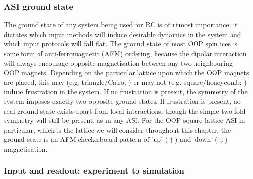 \subsubsection{ASI ground state}
The ground state of any system being used for RC is of utmost importance; it dictates which input methods will induce desirable dynamics in the system and which input protocols will fall flat.
The ground state of most OOP spin ices is some form of anti-ferromagnetic (AFM) ordering, because the dipolar interaction will always encourage opposite magnetisation between any two neighbouring OOP magnets.
Depending on the particular lattice upon which the OOP magnets are placed, this may (e.g. triangle/Cairo; ) or may not (e.g. square/honeycomb; ) induce frustration in the system.
If no frustration is present, the symmetry of the system imposes exactly two opposite ground states.
If frustration is present, no real ground state exists apart from local interactions, though the simple two-fold symmetry will still be present, as in any ASI.
For the OOP square-lattice ASI in particular, which is the lattice we will consider throughout this chapter, the ground state is an AFM checkerboard pattern of `up' ($\uparrow$) and `down' ($\downarrow$) magnetisation.

\subsubsection{Input and readout: experiment to simulation}
